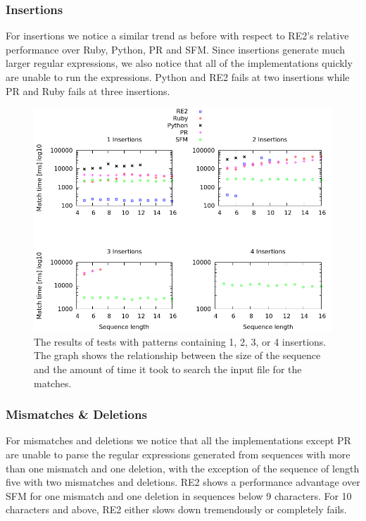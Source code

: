 \documentclass[12pt]{article}
\theoremstyle{definition}
\begin{document}
\subsubsection{Insertions}

For insertions we notice a similar trend as before with respect to RE2's relative performance over Ruby, Python, PR and SFM. Since insertions generate much larger regular expressions, we also notice that all of the implementations quickly are unable to run the expressions. Python and RE2 fails at two insertions while PR and Ruby fails at three insertions.

\begin{figure}[H]
	\begin{center}
		\includegraphics[scale=0.55]{graphs/insertions.png}	
	\end{center}
	\caption{The results of tests with patterns containing 1, 2, 3, or 4 insertions. The graph shows the relationship between the size of the sequence and the amount of time it took to search the input file for the matches.}
	\label{graph:cases:insertions}
\end{figure}

\subsubsection{Mismatches \& Deletions}

For mismatches and deletions we notice that all the implementations except PR are unable to parse the regular expressions generated from sequences with more than one mismatch and one deletion, with the exception of the sequence of length five with two mismatches and deletions. RE2 shows a performance advantage over SFM for one mismatch and one deletion in sequences below 9 characters. For 10 characters and above, RE2 either slows down tremendously or completely fails.
\end{document}
